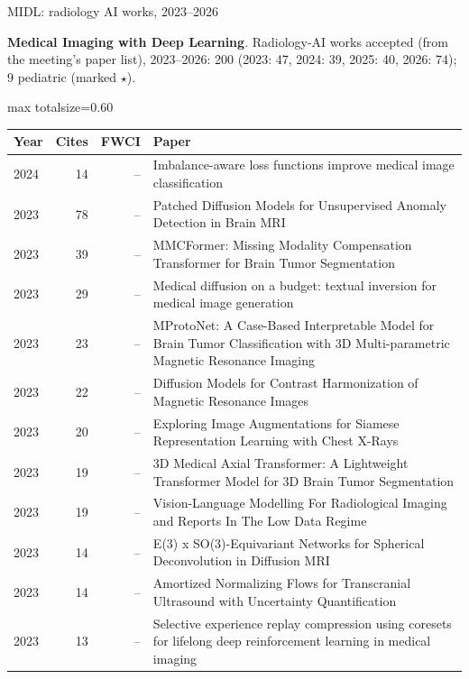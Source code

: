 \documentclass[aspectratio=169]{beamer}
\renewcommand{\arraystretch}{1.08}
\begin{document}
\begin{frame}[category=Conferences]{MIDL: radiology AI works, 2023--2026}
{\scriptsize \textbf{Medical Imaging with Deep Learning}. Radiology-AI works accepted (from the meeting's paper list), 2023--2026: 200 (2023: 47, 2024: 39, 2025: 40, 2026: 74); 9 pediatric (marked $\star$).\par}\vspace{2pt}
\tiny
\begin{adjustbox}{max totalsize={\textwidth}{0.60\textheight}}
\renewcommand{\arraystretch}{1.2}
\begin{tabular}{|l|r|r|>{\raggedright\arraybackslash}p{}|}
\hline \textbf{Year} & \textbf{Cites} & \textbf{FWCI} & \textbf{Paper} \\ \hline
2024 & 14 & -- & Imbalance-aware loss functions improve medical image classification \\ \hline
2023 & 78 & -- & Patched Diffusion Models for Unsupervised Anomaly Detection in Brain MRI \\ \hline
2023 & 39 & -- & MMCFormer: Missing Modality Compensation Transformer for Brain Tumor Segmentation \\ \hline
2023 & 29 & -- & Medical diffusion on a budget: textual inversion for medical image generation \\ \hline
2023 & 23 & -- & MProtoNet: A Case-Based Interpretable Model for Brain Tumor Classification with 3D Multi-parametric Magnetic Resonance Imaging \\ \hline
2023 & 22 & -- & Diffusion Models for Contrast Harmonization of Magnetic Resonance Images \\ \hline
2023 & 20 & -- & Exploring Image Augmentations for Siamese Representation Learning with Chest X-Rays \\ \hline
2023 & 19 & -- & 3D Medical Axial Transformer: A Lightweight Transformer Model for 3D Brain Tumor Segmentation \\ \hline
2023 & 19 & -- & Vision-Language Modelling For Radiological Imaging and Reports In The Low Data Regime \\ \hline
2023 & 14 & -- & E(3) x SO(3)-Equivariant Networks for Spherical Deconvolution in Diffusion MRI \\ \hline
2023 & 14 & -- & Amortized Normalizing Flows for Transcranial Ultrasound with Uncertainty Quantification \\ \hline
2023 & 13 & -- & Selective experience replay compression using coresets for lifelong deep reinforcement learning in medical imaging \\ \hline

\end{tabular}
\end{adjustbox}
\end{frame}
\end{document}
